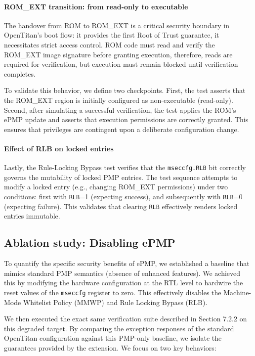\documentclass[10pt,a4paper,twocolumn,twoside]{article}
\begin{document}
\paragraph{ROM\_EXT transition: from read-only to executable}
The handover from ROM to ROM\_EXT is a critical security boundary in OpenTitan's boot flow: it provides the first Root of Trust guarantee, it necessitates strict access control. ROM code must read and verify the ROM\_EXT image signature before granting execution, therefore, reads are required for verification, but execution must remain blocked until verification completes. 

To validate this behavior, we define two checkpoints. First, the test asserts that the ROM\_EXT region is initially configured as non-executable (read-only). Second, after simulating a successful verification, the test applies the ROM's ePMP update and asserts that execution permissions are correctly granted. This ensures that privileges are contingent upon a deliberate configuration change.

\paragraph{Effect of RLB on locked entries}

Lastly, the Rule-Locking Bypass test verifies that the \texttt{mseccfg.RLB} bit correctly governs the mutability of locked PMP entries. The test sequence attempts to modify a locked entry (e.g., changing ROM\_EXT permissions) under two conditions: first with \texttt{RLB}=1 (expecting success), and subsequently with \texttt{RLB}=0 (expecting failure). This validates that clearing \texttt{RLB} effectively renders locked entries immutable.

\subsection{Ablation study: Disabling ePMP}

To quantify the specific security benefits of ePMP, we established a baseline that mimics standard PMP semantics (absence of enhanced features). We achieved this by modifying the hardware configuration at the RTL level to hardwire the reset values of the \texttt{mseccfg} register to zero. This effectively disables the Machine-Mode Whitelist Policy (MMWP) and Rule Locking Bypass (RLB).

We then executed the exact same verification suite described in Section 7.2.2 on this degraded target. By comparing the exception responses of the standard OpenTitan configuration against this PMP-only baseline, we isolate the guarantees provided by the extension. We focus on two key behaviors:
\end{document}
